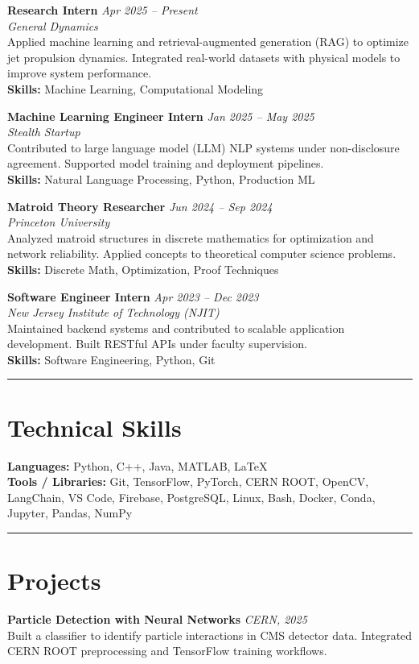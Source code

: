 \documentclass[a4paper,10pt]{article}
\newcommand{\sectionline}{\noindent\rule{\linewidth}{0.5mm}}
\begin{document}
\textbf{Research Intern} \hfill \textit{Apr 2025 -- Present} \\
\textit{General Dynamics} \\
Applied machine learning and retrieval-augmented generation (RAG) to optimize jet propulsion dynamics. Integrated real-world datasets with physical models to improve system performance. \\
\textbf{Skills:} Machine Learning, Computational Modeling

\textbf{Machine Learning Engineer Intern} \hfill \textit{Jan 2025 -- May 2025} \\
\textit{Stealth Startup} \\
Contributed to large language model (LLM) NLP systems under non-disclosure agreement. Supported model training and deployment pipelines. \\
\textbf{Skills:} Natural Language Processing, Python, Production ML

\textbf{Matroid Theory Researcher} \hfill \textit{Jun 2024 -- Sep 2024} \\
\textit{Princeton University} \\
Analyzed matroid structures in discrete mathematics for optimization and network reliability. Applied concepts to theoretical computer science problems. \\
\textbf{Skills:} Discrete Math, Optimization, Proof Techniques

\textbf{Software Engineer Intern} \hfill \textit{Apr 2023 -- Dec 2023} \\
\textit{New Jersey Institute of Technology (NJIT)} \\
Maintained backend systems and contributed to scalable application development. Built RESTful APIs under faculty supervision. \\
\textbf{Skills:} Software Engineering, Python, Git

\sectionline

\section*{Technical Skills}
\textbf{Languages:} Python, C++, Java, MATLAB, LaTeX \\
\textbf{Tools / Libraries:} Git, TensorFlow, PyTorch, CERN ROOT, OpenCV, LangChain, VS Code, Firebase, PostgreSQL, Linux, Bash, Docker, Conda, Jupyter, Pandas, NumPy

\sectionline

\section*{Projects}
\textbf{Particle Detection with Neural Networks} \hfill \textit{CERN, 2025} \\
Built a classifier to identify particle interactions in CMS detector data. Integrated CERN ROOT preprocessing and TensorFlow training workflows.
\end{document}
